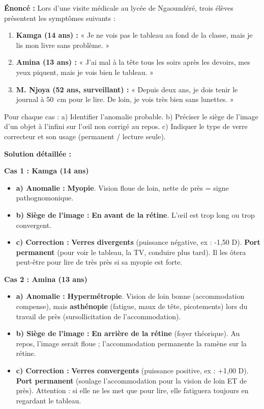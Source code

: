\documentclass[11pt]{article}
\begin{document}
\begin{exoresolu}
\textbf{Énoncé :} Lors d'une visite médicale au lycée de Ngaoundéré, trois élèves présentent les symptômes suivants :
\begin{enumerate}
    \item \textbf{Kamga (14 ans) :} « Je ne vois pas le tableau au fond de la classe, mais je lis mon livre sans problème. »
    \item \textbf{Amina (13 ans) :} « J'ai mal à la tête tous les soirs après les devoirs, mes yeux piquent, mais je vois bien le tableau. »
    \item \textbf{M. Njoya (52 ans, surveillant) :} « Depuis deux ans, je dois tenir le journal à \SI{50}{cm} pour le lire. De loin, je vois très bien sans lunettes. »
\end{enumerate}
Pour chaque cas : a) Identifier l'anomalie probable. b) Préciser le siège de l'image d'un objet à l'infini sur l'œil non corrigé au repos. c) Indiquer le type de verre correcteur et son usage (permanent / lecture seule).

\tcblower
\textbf{Solution détaillée :}

\textbf{Cas 1 : Kamga (14 ans)}
\begin{itemize}
    \item \textbf{a) Anomalie :} \textbf{Myopie}. Vision floue de loin, nette de près = signe pathognomonique.
    \item \textbf{b) Siège de l'image :} \textbf{En avant de la rétine}. L'œil est trop long ou trop convergent.
    \item \textbf{c) Correction :} \textbf{Verres divergents} (puissance négative, ex : -1,50 D). \textbf{Port permanent} (pour voir le tableau, la TV, conduire plus tard). Il les ôtera peut-être pour lire de très près si sa myopie est forte.
\end{itemize}

\textbf{Cas 2 : Amina (13 ans)}
\begin{itemize}
    \item \textbf{a) Anomalie :} \textbf{Hypermétropie}. Vision de loin bonne (accommodation compense), mais \textbf{asthénopie} (fatigue, maux de tête, picotements) lors du travail de près (sursollicitation de l'accommodation).
    \item \textbf{b) Siège de l'image :} \textbf{En arrière de la rétine} (foyer théorique). Au repos, l'image serait floue ; l'accommodation permanente la ramène sur la rétine.
    \item \textbf{c) Correction :} \textbf{Verres convergents} (puissance positive, ex : +1,00 D). \textbf{Port permanent} (soulage l'accommodation pour la vision de loin ET de près). Attention : si elle ne les met que pour lire, elle fatiguera toujours en regardant le tableau.
\end{itemize}


\end{exoresolu}
\end{document}
